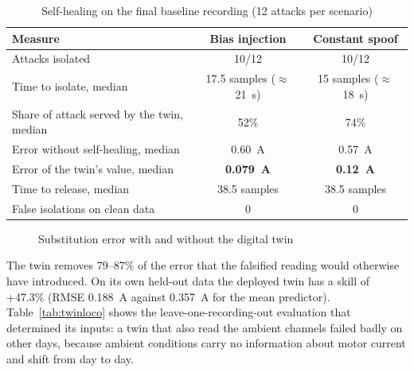 \begin{table}[htbp]
\centering
\caption{Self-healing on the final baseline recording (12 attacks per scenario)}
\label{tab:selfheal}
\small
\begin{tabularx}{\textwidth}{@{}X c c@{}}
\toprule
\textbf{Measure} & \textbf{Bias injection} & \textbf{Constant spoof} \\
\midrule
Attacks isolated & 10/12 & 10/12 \\
Time to isolate, median & 17.5 samples ($\approx$ 21~s) & 15 samples ($\approx$ 18~s) \\
Share of attack served by the twin, median & 52\% & 74\% \\
Error without self-healing, median & 0.60~A & 0.57~A \\
Error of the twin's value, median & \textbf{0.079~A} & \textbf{0.12~A} \\
Time to release, median & 38.5 samples & 38.5 samples \\
False isolations on clean data & 0 & 0 \\
\bottomrule
\end{tabularx}
\end{table}

\begin{figure}[htbp]
\centering
{}
\caption{Substitution error with and without the digital twin}
\label{fig:healerr}
\end{figure}

The twin removes 79--87\% of the error that the falsified reading would otherwise have introduced. On its own held-out data the deployed twin has a skill of +47.3\% (RMSE 0.188~A against 0.357~A for the mean predictor). Table~\ref{tab:twinloco} shows the leave-one-recording-out evaluation that determined its inputs: a twin that also read the ambient channels failed badly on other days, because ambient conditions carry no information about motor current and shift from day to day.

